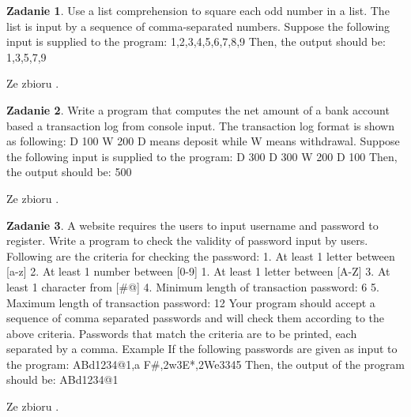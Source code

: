 \documentclass[11pt]{article}
\theoremstyle{definition}
\newtheorem{zadanie}{Zadanie}
\newcommand{\fromA}{\small Ze zbioru \cite{python100}.}
\begin{document}
\begin{zadanie}
Use a list comprehension to square each odd number in a list. The list is input by a sequence of comma-separated numbers.
Suppose the following input is supplied to the program:
1,2,3,4,5,6,7,8,9
Then, the output should be:
1,3,5,7,9

\fromA
\end{zadanie}
\begin{zadanie}
Write a program that computes the net amount of a bank account based a transaction log from console input. The transaction log format is shown as following:
D 100
W 200
D means deposit while W means withdrawal.
Suppose the following input is supplied to the program:
D 300
D 300
W 200
D 100
Then, the output should be:
500

\fromA
\end{zadanie}
\begin{zadanie}
A website requires the users to input username and password to register. Write a program to check the validity of password input by users.
Following are the criteria for checking the password:
1. At least 1 letter between [a-z]
2. At least 1 number between [0-9]
1. At least 1 letter between [A-Z]
3. At least 1 character from [\#@]
4. Minimum length of transaction password: 6
5. Maximum length of transaction password: 12
Your program should accept a sequence of comma separated passwords and will check them according to the above criteria. Passwords that match the criteria are to be printed, each separated by a comma.
Example
If the following passwords are given as input to the program:
ABd1234@1,a F\#,2w3E*,2We3345
Then, the output of the program should be:
ABd1234@1

\fromA
\end{zadanie}
\end{document}
